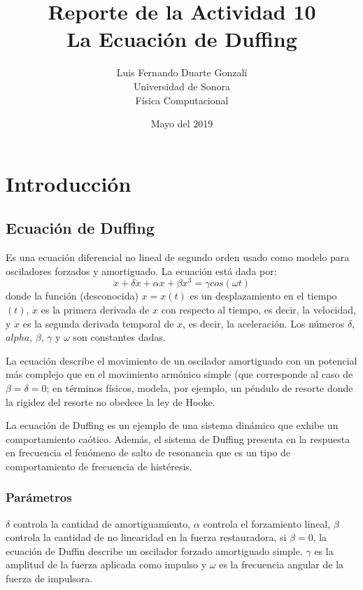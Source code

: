 \documentclass{article}
\title{\textbf{Reporte de la Actividad 10}\\ La Ecuación de Duffing}
\author{Luis Fernando Duarte Gonzalí \\ Universidad de Sonora \\ Física Computacional}
\date{Mayo del 2019}
\begin{document}
\maketitle


\section{Introducción}
\subsection{Ecuación de Duffing}
Es una ecuación diferencial no lineal de segundo orden usado como modelo para osciladores forzados y amortiguado. La ecuación está dada por:
\begin{equation}
    \ddot x + \delta \dot x + \alpha x + \beta x^3 = \gamma cos (\omega t)
\end{equation}
donde la función (desconocida) $x = x(t)$ es un desplazamiento en el tiempo $(t)$, $\dot x$ es la primera derivada de $x$ con respecto al tiempo, es decir, la velocidad, y $\ddot x$ es la segunda derivada temporal de $x$, es decir, la aceleración. Los números $\delta$, $alpha$, $\beta$, $\gamma$ y $\omega$ son constantes dadas.

La ecuación describe el movimiento de un oscilador amortiguado con un potencial más complejo que en el movimiento armónico simple (que corresponde al caso de $\beta = \delta = 0$; en términos físicos, modela, por ejemplo, un péndulo de resorte donde la rigidez del resorte no obedece la ley de Hooke.

La ecuación de Duffing es un ejemplo de una sistema dinámico que exhibe un comportamiento caótico. Además, el sistema de Duffing presenta en la respuesta en frecuencia el fenómeno de salto de resonancia que es un tipo de comportamiento de frecuencia de histéresis.

\subsubsection{Parámetros}
$\delta$ controla la cantidad de amortiguamiento, $\alpha$ controla el forzamiento lineal, $\beta$ controla la cantidad de no linearidad en la fuerza restauradora, si $\beta = 0$, la ecuación de Duffin describe un oscilador forzado amortiguado simple. $\gamma$ es la amplitud de la fuerza aplicada como impulso y $\omega$ es la frecuencia angular de la fuerza de impulsora.
\end{document}
